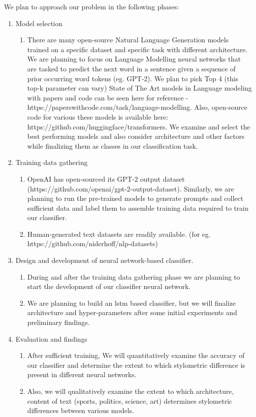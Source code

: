 \documentclass[11pt,letterpaper]{article}
\begin{document}
We plan to approach our problem in the following phases:
 \begin{enumerate}
   \item Model selection
   \begin{enumerate}
     \item There are many open-source Natural Language Generation models trained on a specific dataset and specific task with different architecture. We are planning to focus on Language Modelling neural networks that are tasked to predict the next word in a sentence given a sequence of prior occurring word tokens (eg. GPT-2). We plan to pick Top 4 (this top-k parameter can vary) State of The Art models in Language modeling with papers and code can be seen here for reference - https://paperswithcode.com/task/language-modelling. Also, open-source code for various these models is available here: https://github.com/huggingface/transformers. We examine and select the best performing models and also consider architecture and other factors while finalizing them as classes in our classification task.
   \end{enumerate}

   \item Training data gathering
   \begin{enumerate}
     \item OpenAI has open-sourced its GPT-2 output dataset (https://github.com/openai/gpt-2-output-dataset). Similarly, we are planning to run the pre-trained models to generate prompts and collect sufficient data and label them to assemble training data required to train our classifier.
     \item Human-generated text datasets are readily available. (for eg. https://github.com/niderhoff/nlp-datasets)
   \end{enumerate}

   \item Design and development of neural network-based classifier.
   \begin{enumerate}
     \item During and after the training data gathering phase we are planning to start the development of our classifier neural network.
     \item We are planning to build an lstm based classifier, but we will finalize architecture and hyper-parameters after some initial experiments and preliminary findings.
   \end{enumerate}

   \item Evaluation and findings
   \begin{enumerate}
     \item After sufficient training, We will quantitatively examine the accuracy of our classifier and determine the extent to which stylometric difference is present in different neural networks.
     \item Also, we will qualitatively examine the extent to which architecture, content of text (sports, politics, science, art) determines stylometric differences between various models.
   \end{enumerate}

 \end{enumerate}
\end{document}
